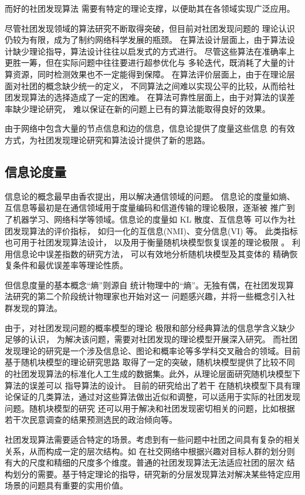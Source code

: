 而好的社团发现算法
需要有特定的理论支撑，以便助其在各领域实现广泛应用。

尽管社团发现领域的算法研究不断取得突破，但目前对社团发现问题的
理论认识仍较为有限，成为了制约网络科学发展的瓶颈。
在算法设计层面上，由于算法设计缺少理论指导，算法设计往往以启发式的方式进行。
尽管这些算法在准确率上更胜一筹，但在实际问题中往往要进行超参优化与
多轮迭代，既消耗了大量的计算资源，同时检测效果也不一定能得到保障。
在算法评价层面上，由于在理论层面对社团的概念缺少统一的定义，
不同算法之间难以实现公平的比较，从而给社团发现算法的选择造成了一定的困难。
在算法可靠性层面上，由于对算法的误差率缺少理论研究，
难以保证在新的问题上已有的算法能取得良好的效果。

由于网络中包含大量的节点信息和边的信息，信息论提供了度量这些信息
的有效方式，为社团发现理论研究和算法设计提供了新的思路。


\subsection{信息论度量}
信息论的概念最早由香农提出，用以解决通信领域的问题。
信息论的度量如熵、互信息等最初是在通信领域用于度量编码和信道传输的理论极限，逐渐被
推广到了机器学习、网络科学等领域。信息论的度量如 KL 散度、互信息等 可以作为社团发现算法的评价指标，
如归一化的互信息(NMI)\cite{Danon_2005}、变分信息(VI) \cite{2007Comparing}等。
此类指标也可用于社团发现算法设计\cite{ic2002, mim, app12094203}，
以及用于衡量随机块模型恢复误差的理论极限 \cite{abbe2015community, zhang2016}。
利用信息论中误差指数的研究方法，
可以有效地分析随机块模型及其变体的
精确恢复条件和最优误差率等理论性质。

但信息度量的基本概念“熵”则源自
统计物理中的“熵”。无独有偶，在社团发现算法研究的第二个阶段统计物理家也开始对这一
问题感兴趣，并将一些概念引入社群发现的算法。

由于，对社团发现问题的概率模型的理论
极限和部分经典算法的信息学含义缺少足够的认识，
为解决该问题，需要对社团发现的理论模型开展深入研究。
而社团发现理论的研究是一个涉及信息论、图论和概率论等多学科交叉融合的领域。目前基于随机块模型的理论研究思路
取得了一定的突破，随机块模型提供了比较不同的社团发现算法的标准化人工生成的数据集。此外，从理论层面研究随机块模型下算法的误差可以
指导算法的设计。
目前的研究给出了若干
在随机块模型下具有理论保证的几类算法，通过对这些算法做出近似和调整，可以适用于实际的社团发现问题。随机块模型的研究
还可以用于解决和社团发现密切相关的问题，比如根据若干次民意调查的结果预测选民的政治倾向等。

社团发现算法需要适合特定的场景。考虑到有一些问题中社团之间具有复杂的相关关系，从而构成一定的层次结构。如
在社交网络中根据兴趣对目标人群的划分则有大的尺度和精细的尺度多个维度。普通的社团发现算法无法适应社团的层次
结构划分的需要。基于特定理论的指导，研究新的分层发现算法对解决某些特定应用场景的问题具有重要的实用价值。

